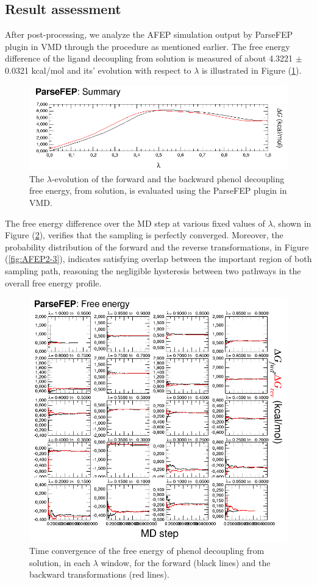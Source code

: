 \documentclass[9pt,tutorial]{livecoms}
\begin{document}
\subsection{Result assessment}
After post-processing, we analyze the AFEP simulation output by ParseFEP plugin in VMD through the procedure as mentioned earlier. The free energy difference of the ligand decoupling from solution is measured of about 4.3221 {$\pm$} 0.0321 kcal/mol and its’ evolution with respect to {$\lambda$} is illustrated in Figure (\ref{fig:AFEP2-1}).
\begin{figure}[h!t]
\centering
\includegraphics[width=\linewidth]{AFEP2}
\caption{The {$\lambda$}-evolution of the forward and the backward phenol decoupling free energy, from solution, is evaluated using the ParseFEP plugin in VMD.}
\label{fig:AFEP2-1}
\end{figure}
The free energy difference over the MD step at various fixed values of {$\lambda$}, shown in Figure (\ref{fig:AFEP2-2}), verifies that the sampling is perfectly converged. Moreover, the probability distribution of the forward and the reverse transformations, in Figure (\ref{fig:AFEP2-3}), indicates satisfying overlap between the important region of both sampling path, reasoning the negligible hysteresis between two pathways in the overall free energy profile.

\begin{figure}[h!t]
\centering
\includegraphics[width=0.6\linewidth]{AFEP2-solution}
\caption{Time convergence of the free energy of phenol decoupling from solution, in each $\lambda$ window, for the forward (black lines) and the backward transformations (red lines).}
\label{fig:AFEP2-2}
\end{figure}
\end{document}
